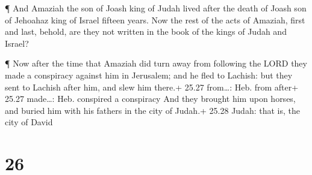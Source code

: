  ¶ And Amaziah the son of Joash king of Judah lived after
the death of Joash son of Jehoahaz king of Israel fifteen years.
 Now the rest of the acts of Amaziah, first and last,
behold, are they not written in the book of the kings of Judah and
Israel?

 ¶ Now after the time that Amaziah did turn away from
following the LORD they made a conspiracy against him in Jerusalem; and
he fled to Lachish: but they sent to Lachish after him, and slew him
there.+ 25.27 from\ldots: Heb. from after+ 25.27 made\ldots: Heb.
conspired a conspiracy  And they brought him upon horses,
and buried him with his fathers in the city of Judah.+ 25.28 Judah: that
is, the city of David

\hypertarget{section-25}{%
\section{26}\label{section-25}}

